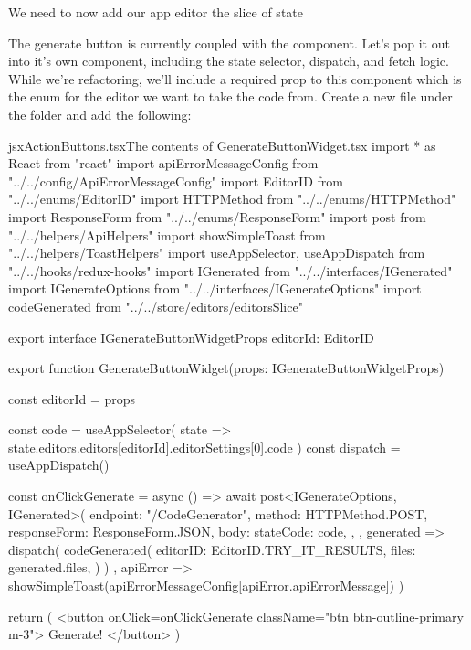 \documentclass[a4paper,headinclude=on,footinclude=on,12pt,oneside]{scrbook}
\begin{document}
We need to now add our app editor the slice of state


The generate button is currently coupled with the  component. Let's pop it out into it's own component, including the state selector, dispatch, and fetch logic. While we're refactoring, we'll include a required prop to this component which is the  enum for the editor we want to take the code from. Create a new file  under the  folder and add the following:

\begin{codeInput}{jsx}{ActionButtons.tsx}{The contents of GenerateButtonWidget.tsx}
import * as React from "react"
import { apiErrorMessageConfig } from "../../config/ApiErrorMessageConfig"
import EditorID from "../../enums/EditorID"
import HTTPMethod from "../../enums/HTTPMethod"
import ResponseForm from "../../enums/ResponseForm"
import { post } from "../../helpers/ApiHelpers"
import { showSimpleToast } from "../../helpers/ToastHelpers"
import { useAppSelector, useAppDispatch } from "../../hooks/redux-hooks"
import IGenerated from "../../interfaces/IGenerated"
import IGenerateOptions from "../../interfaces/IGenerateOptions"
import { codeGenerated } from "../../store/editors/editorsSlice"

export interface IGenerateButtonWidgetProps {
  editorId: EditorID
}

export function GenerateButtonWidget(props: IGenerateButtonWidgetProps) {
  const { editorId } = props

  const code = useAppSelector(
    state => state.editors.editors[editorId].editorSettings[0].code
  )
  const dispatch = useAppDispatch()

  const onClickGenerate = async () => {
    await post<IGenerateOptions, IGenerated>(
      {
        endpoint: "/CodeGenerator",
        method: HTTPMethod.POST,
        responseForm: ResponseForm.JSON,
        body: {
          stateCode: code,
        },
      },
      generated => {
        dispatch(
          codeGenerated({
            editorID: EditorID.TRY_IT_RESULTS,
            files: generated.files,
          })
        )
      },
      apiError => {
        showSimpleToast(apiErrorMessageConfig[apiError.apiErrorMessage])
      }
    )
  }

  return (
    <button onClick={onClickGenerate} className="btn btn-outline-primary m-3">
      Generate!
    </button>
  )
}  
\end{codeInput}
\end{document}
